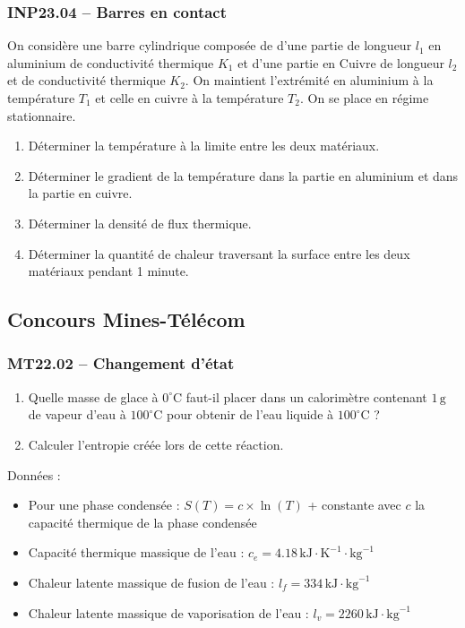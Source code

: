 \subsubsection*{INP23.04 -- Barres en contact }

On considère une barre cylindrique composée de d'une partie de longueur $l_{1}$ en aluminium de conductivité thermique $K_{1}$ et d'une partie en Cuivre de longueur $l_{2}$ et de conductivité thermique $K_{2}$. On maintient l'extrémité en aluminium à la température $T_{1}$ et celle en cuivre à la température $T_{2}$. On se place en régime stationnaire.

\begin{enumerate}
\item Déterminer la température à la limite entre les deux matériaux.
\item Déterminer le gradient de la température dans la partie en aluminium et dans la partie en cuivre.
\item Déterminer la densité de flux thermique.
\item Déterminer la quantité de chaleur traversant la surface entre les deux matériaux pendant 1 minute.
\end{enumerate}

\newpage
\subsection*{Concours Mines-Télécom}
\subsubsection*{MT22.02 -- Changement d'état  \corrige}

\begin{enumerate}
\item Quelle masse de glace à $0^\circ\text{C}$ faut-il placer dans un calorimètre contenant $1\,\text{g}$ de vapeur d'eau à $100^\circ\text{C}$ pour obtenir de l'eau liquide à $100^\circ\text{C}$ ?
\item Calculer l'entropie créée lors de cette réaction.
\end{enumerate}

Données :
\begin{itemize}
\item Pour une phase condensée : $S(T) = c \times \ln(T)$ + constante avec $c$ la capacité thermique de la phase condensée
\item Capacité thermique massique de l'eau : $c_{e} = 4.18\,\text{kJ}\cdot\text{K}^{-1}\cdot\text{kg}^{-1}$
\item Chaleur latente massique de fusion de l'eau : $l_{f} = 334\,\text{kJ}\cdot\text{kg}^{-1}$
\item Chaleur latente massique de vaporisation de l'eau : $l_{v} = 2260\,\text{kJ}\cdot\text{kg}^{-1}$
\end{itemize}

